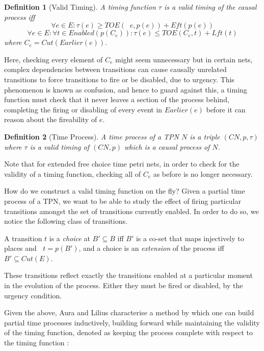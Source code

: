 \documentclass[conference]{IEEEtran}
\DeclareMathOperator*{\pre}{^\bullet}
\newtheorem{definition}{Definition}
\begin{document}
	\begin{definition}[Valid Timing] \label{validt} A timing function $\tau$ is a \textit{valid timing} of the causal process iff 
		$$\forall e \in E : \tau(e) \geq TOE(\pre e, p(e) ) + Eft(p(e))$$
		$$\forall e \in E : \forall t \in Enabled (p(C_e)) : \tau(e) \leq TOE(C_e, t) + Lft(t)$$ 
		where $C_e = Cut(Earlier(e))$. 
	\end{definition}
	
	Here, checking every element of $C_e$ might seem unnecessary but in certain nets, complex dependencies between transitions can cause causally unrelated transitions to force transitions to fire or be disabled, due to urgency. 
	This phenomenon is known as confusion, and hence to guard against this, a timing function must check that it never leaves a section of the process behind, completing the firing or disabling of every event in $Earlier(e)$ before it can reason about the fireability of $e$. 
	
	\begin{definition}[Time Process] \label{tp} A \textit{time process} of a TPN $N$ is a triple $(CN, p, \tau)$ where $\tau$ is a valid timing of $(CN, p)$ which is a causal process of $N$. 
	\end{definition}
	
Note that for extended free choice time petri nets, in order to check for the validity of a timing function, checking all of $C_e$ as before is no longer necessary. 
	
	How do we construct a valid timing function on the fly? 
	Given a partial time process of a TPN, we want to be able to study the effect of firing particular transitions amongst the set of transitions currently enabled. 
	In order to do so, we notice the following class of transitions. 
	
	A transition $t$ is a \textit{choice} at $B' \subseteq B$ iff $B'$ is a co-set that maps injectively to places and $\pre t = p(B')$, and a choice is an \textit{extension} of the process iff $B' \subseteq Cut(E)$. 
	
	These transitions reflect exactly the transitions enabled at a particular moment in the evolution of the process. Either they must be fired or disabled, by the urgency condition. 
	
	Given the above, Aura and Lilius characterise a method by which one can build partial time processes inductively, building forward while maintaining the validity of the timing function, denoted as keeping the process complete with respect to the timing function : 
	
\end{document}
